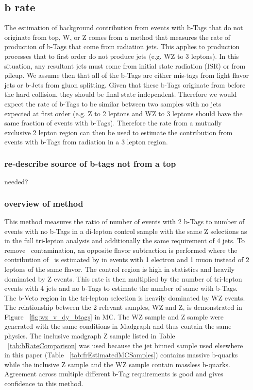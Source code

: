 	\subsection{b rate}
	\label{sec:brate_estimation}
	The estimation of background contribution from events with b-Tags that do not originate from top, W, or Z  comes from a method that measures the rate of production of b-Tags that come from radiation jets. This applies to production processes that to first order do not produce jets (e.g. WZ to 3 leptons). In this situation, any resultant jets must come from initial state radiation (ISR) or from pileup. We assume then that all of the b-Tags are either mis-tags from light flavor jets or b-Jets from gluon splitting. Given that these b-Tags originate from before the hard collision, they should be final state independent. Therefore we would expect the rate of b-Tags to be similar between two samples with no jets expected at first order (e.g. Z to 2 leptons and WZ to 3 leptons should have the same fraction of events with b-Tags). Therefore the rate from a mutually exclusive 2 lepton region can then be used to estimate the contribution from events with b-Tags from radiation in a 3 lepton region.
	
        		\subsubsection{re-describe source of b-tags not from a top}
		needed?
		
        		\subsubsection{overview of method}
		This method measures the ratio of number of events with 2 b-Tags to number of events with no b-Tags in a di-lepton control sample with the same Z selections as in the full tri-lepton analysis and additionally the same requirement of 4 jets. To remove \ttbar \ contamination, an opposite flavor subtraction is performed where the contribution of \ttbar \ is estimated by in events with 1 electron and 1 muon instead of 2 leptons of the same flavor. The control region is high in statistics and heavily dominated by Z events.  This rate is then multiplied by the number of tri-lepton events with 4 jets and no b-Tags to estimate the number of same with b-Tags. The b-Veto region in the tri-lepton selection is heavily dominated by WZ events.\\

The relationship between the 2 relevant samples, WZ and Z, is demonstrated in Figure ~\ref{fig:wz_v_dy_btags} in MC. The WZ sample and Z sample were generated with the same conditions in Madgraph and thus contain the same physics. The inclusive madgraph Z sample listed in Table ~\ref{tab:bRateComparison} was used because the jet binned sample used elsewhere in this paper (Table ~\ref{tab:frEstimatedMCSamples}) contains massive b-quarks while the inclusive Z sample and the WZ sample contain massless b-quarks. Agreement across multiple different b-Tag requirements is good and gives confidence to this method.\\

